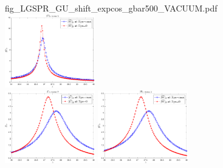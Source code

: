 \documentclass[11pt]{article}
\begin{document}
\begin{figure}[H]
{		{fig_LGSPR_GU_shift_expcos_gbar500_VACUUM.pdf}}
	\quad
	\subfigure 
	{\includegraphics[width=0.35\textwidth]
		{fig_LGSPR_GW_shift_expcos_gbar500_VACUUM.pdf}}
	\\
	\subfigure 
	{\includegraphics[width=0.35\textwidth]
		{fig_LGSPR_GU_shift_expcos_gbar1000_VACUUM.pdf}}
	\quad
	\subfigure 
	{\includegraphics[width=0.35\textwidth]
		{fig_LGSPR_GW_shift_expcos_gbar1000_VACUUM.pdf}}
\end{figure}
\end{document}
